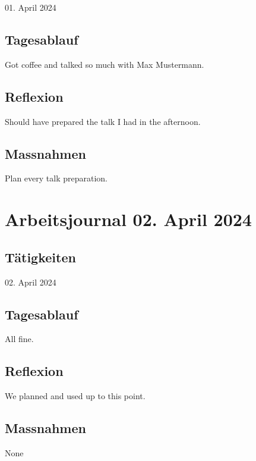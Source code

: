 	\begin{timetable}{01. April 2024}
	\end{timetable}

	\subsection{Tagesablauf}
	Got coffee and talked so much with Max Mustermann.
	
	\subsection{Reflexion}
	Should have prepared the talk I had in the afternoon.
	
	\subsection{Massnahmen}
	Plan every talk preparation.

	\section{Arbeitsjournal 02. April 2024}
	
	\subsection{Tätigkeiten}

	\begin{timetable}{02. April 2024}
	\end{timetable}

	\subsection{Tagesablauf}
	All fine.
	
	\subsection{Reflexion}

	We planned \the\value{timetableoverallsolltotal} and used \the\value{timetableoverallisttotal} up to this point.
	
	\subsection{Massnahmen}
	None
	
